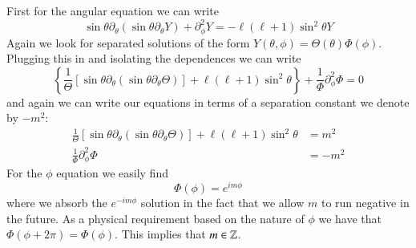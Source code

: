 \documentclass[12pt, a4paper, oneside, openright, titlepage]{book}
\begin{document}
First for the angular equation we can write \begin{equation*}
    \sin\theta\partial_{\theta}(\sin\theta\partial_{\theta}Y)+\partial_{\phi}^2Y = -\ell(\ell+1)\sin^2\theta Y
\end{equation*}
Again we look for separated solutions of the form $Y(\theta,\phi) = \Theta(\theta)\Phi(\phi)$. Plugging this in and isolating the dependences we can write\begin{equation*}
    \left\{\frac{1}{\Theta}\left[\sin\theta\partial_{\theta}(\sin\theta\partial_{\theta}\Theta)\right]+\ell(\ell+1)\sin^2\theta\right\}+\frac{1}{\Phi}\partial_{\phi}^2\Phi = 0
\end{equation*}
and again we can write our equations in terms of a separation constant we denote by $-m^2$: \begin{align*}
    \frac{1}{\Theta}\left[\sin\theta\partial_{\theta}(\sin\theta\partial_{\theta}\Theta)\right]+\ell(\ell+1)\sin^2\theta &= m^2 \\
    \frac{1}{\Phi}\partial_{\phi}^2\Phi &= -m^2
\end{align*}
For the $\phi$ equation we easily find \begin{equation*}
    \Phi(\phi) = e^{im\phi}
\end{equation*}
where we absorb the $e^{-im\phi}$ solution in the fact that we allow $m$ to run negative in the future. As a physical requirement based on the nature of $\phi$ we have that $\Phi(\phi+2\pi) = \Phi(\phi)$. This implies that $m \in \mathbb Z$. 
\end{document}
